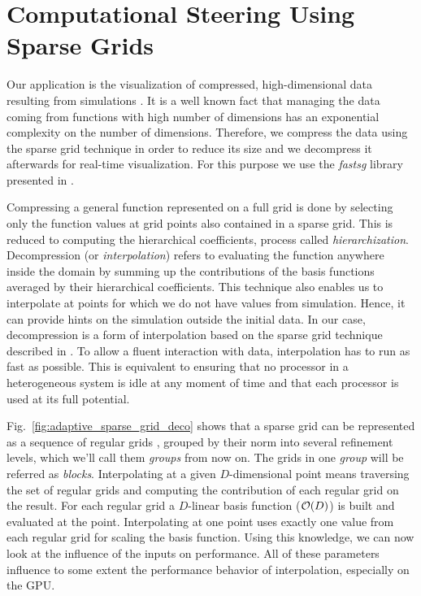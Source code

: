 \section{Computational Steering Using Sparse Grids}


Our application is the visualization of compressed, high-dimensional data
resulting from simulations \cite{butnaru2011}. It is a well known fact that
managing the data coming from functions with high number of dimensions has an
exponential complexity on the number of dimensions. Therefore, we compress the
data using the sparse grid technique in order to reduce its size and we
decompress it afterwards for real-time visualization. For this purpose we use
the \textit{fastsg} library presented in \cite{murarasu2012}.

Compressing a general function represented on a full grid is done by selecting
only the function values at grid points also contained in a sparse grid. This is
reduced to computing the hierarchical coefficients, process called
\textit{hierarchization}. Decompression (or \textit{interpolation}) refers to
evaluating the function anywhere inside the domain by summing up the
contributions of the basis functions averaged by their hierarchical
coefficients. This technique also enables us to interpolate at points for which
we do not have values from simulation. Hence, it can provide hints on the
simulation outside the initial data. In our case, decompression is a form of
interpolation based on the sparse grid technique described in
\cite{bungartz2004}. To allow a fluent interaction with data, interpolation has
to run as fast as possible. This is equivalent to ensuring that no processor in
a heterogeneous system is idle at any moment of time and that each processor is
used at its full potential.

Fig.~\ref{fig:adaptive_sparse_grid_deco} shows that a sparse grid can be
represented as a sequence of regular grids \cite{murarasu2011}, grouped by their
norm into several refinement levels, which we'll call them \textit{groups} from
now on. The grids in one \textit{group} will be referred as \textit{blocks}.
Interpolating at a given $D$-dimensional point means traversing the set of
regular grids and computing the contribution of each regular grid on the result. For
each regular grid a $D$-linear basis function ($\Otime{D}$) is built and
evaluated at the point. Interpolating at one point uses exactly one value from each
regular grid for scaling the basis function. Using this knowledge, we can now
look at the influence of the inputs on performance. All of these parameters
influence to some extent the performance behavior of interpolation, especially
on the GPU.

